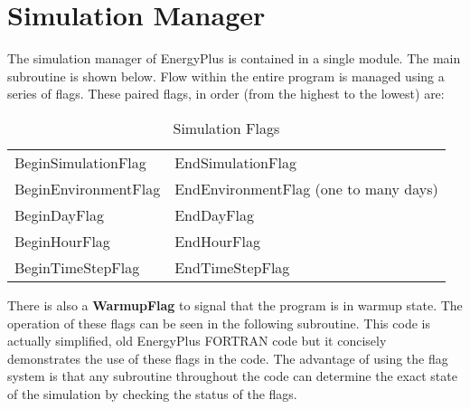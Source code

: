 \section{Simulation Manager}\label{simulation-manager}

The simulation manager of EnergyPlus is contained in a single module. The main subroutine is shown below. Flow within the entire program is managed using a series of flags. These paired flags, in order (from the highest to the lowest) are:

\begin{longtable}[c]{@{}ll@{}}
\caption{Simulation Flags \label{table:simulation-flags}} \tabularnewline
\toprule
\endfirsthead

\caption[]{Simulation Flags} \tabularnewline
\toprule
\endhead

BeginSimulationFlag & EndSimulationFlag \tabularnewline
BeginEnvironmentFlag & EndEnvironmentFlag (one to many days) \tabularnewline
BeginDayFlag & EndDayFlag \tabularnewline
BeginHourFlag & EndHourFlag \tabularnewline
BeginTimeStepFlag & EndTimeStepFlag \tabularnewline
\bottomrule
\end{longtable}

There is also a \textbf{WarmupFlag} to signal that the program is in warmup state. The operation of these flags can be seen in the following subroutine. This code is actually simplified, old EnergyPlus FORTRAN code but it concisely demonstrates the use of these flags in the code. The advantage of using the flag system is that any subroutine throughout the code can determine the exact state of the simulation by checking the status of the flags.

